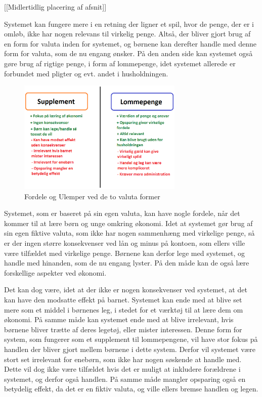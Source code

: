 [[Midlertidlig placering af afsnit]]

Systemet kan fungere mere i en retning der ligner et spil, hvor de penge, der er i omløb, ikke har nogen relevans til virkelig penge. Altså, der bliver gjort brug af en form for valuta inden for systemet, og børnene kan derefter handle med denne form for valuta, som de nu engang ønsker. På den anden side kan systemet også gøre brug af rigtige penge, i form af lommepenge, idet systemet allerede er forbundet med pligter og evt. andet i husholdningen.

\begin{figure}[htb]
\centering
\includegraphics[width=0.7\textwidth]{Billeder/supplomme.png}
\caption{Fordele og Ulemper ved de to valuta former}
\label{SuppLomme}
\end{figure}

Systemet, som er baseret på sin egen valuta, kan have nogle fordele, når det kommer til at lære børn og unge omkring økonomi. Idet at systemet gør brug af sin egen fiktive valuta, som ikke har nogen sammenhæng med virkelige penge, så er der ingen større konsekvenser ved lån og minus på kontoen, som ellers ville være tilfældet med virkelige penge. Børnene kan derfor lege med systemet, og handle med hinanden, som de nu engang lyster. På den måde kan de også lære forskellige aspekter ved økonomi.

Det kan dog være, idet at der ikke er nogen konsekvenser ved systemet, at det kan have den modsatte effekt på barnet.  Systemet kan ende med at blive set mere som et middel i børnenes leg, i stedet for et værktøj til at lære dem om økonomi. På samme måde kan systemet ende med at blive irrelevant, hvis børnene bliver trætte af deres legetøj, eller mister interessen. Denne form for system, som fungerer som et supplement til lommepengene, vil have stor fokus på handlen der bliver gjort mellem børnene i dette system. Derfor vil systemet være stort set irrelevant for enebørn, som ikke har nogen søskende at handle med. Dette vil dog ikke være tilfældet hvis det er muligt at inkludere forældrene i systemet, og derfor også handlen. På samme måde mangler opsparing også en betydelig effekt, da det er en fiktiv valuta, og ville ellers bremse handlen og legen.
 
